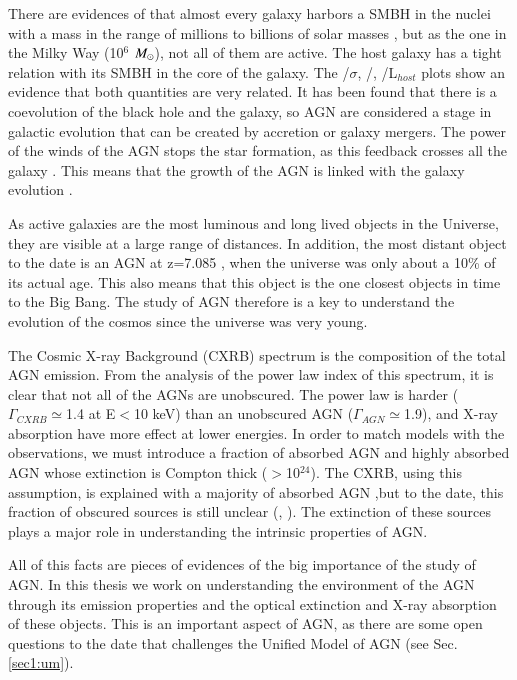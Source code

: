 There are evidences of that almost every galaxy harbors a SMBH in the nuclei with a mass in the range of millions to billions of solar masses \citep{magorrian98}, but as the one in the Milky Way (10$^6$ $M_\odot$), not all of them are active. The host galaxy has a tight relation with its SMBH in the core of the galaxy. The \MSMBH /$\sigma$, \MSMBH/\Mhost,  \MSMBH/L$_{host}$  plots show an evidence that both quantities are very related. It has been found that there is a coevolution of the black hole and the galaxy, so AGN are considered a stage in galactic evolution that can be created by accretion or galaxy mergers. The power of the winds of the AGN stops the star formation, as this feedback crosses all the galaxy \citep{fabian12}. This means that the growth of the AGN is linked with the galaxy evolution \citep{kormendy13}.

As active galaxies are the most luminous and long lived objects in the Universe, they are visible at a large range of distances. In addition, the most distant object to the date is an AGN at z=7.085 \citep{mortlock11}, when the universe was only about a 10\% of its actual age. This also means that this object is the one closest objects in time to the Big Bang. The study of AGN therefore is a key to understand the evolution of the cosmos since the universe was very young. 


The Cosmic X-ray Background (CXRB) spectrum is the composition of the total AGN emission. From the analysis of the power law index of this spectrum, it is clear that not all of the AGNs are unobscured. The power law is harder ($\Gamma_{CXRB}\simeq$1.4 at E$<$10 keV) than an unobscured AGN ($\Gamma_{AGN}\simeq$1.9), and X-ray absorption have more effect at lower energies. In order to match models with the observations, we must introduce a fraction of absorbed AGN and highly absorbed AGN whose extinction is Compton thick (\NH$>$10$^{24}$\cm). The CXRB, using this assumption, is explained with a majority of absorbed AGN ,but to the date, this fraction of obscured sources is still unclear (\citealt{setti89}, \citealt{comastri95}). The extinction of these sources plays a major role in understanding the intrinsic properties of AGN.

All of this facts are pieces of evidences of the big importance of the study of AGN. In this thesis we work on understanding the environment of the AGN through its emission properties and the optical extinction and X-ray absorption of these objects. This is an important aspect of AGN, as there are some open questions to the date that challenges the Unified Model of AGN  (see Sec. \ref{sec1:um}). 


